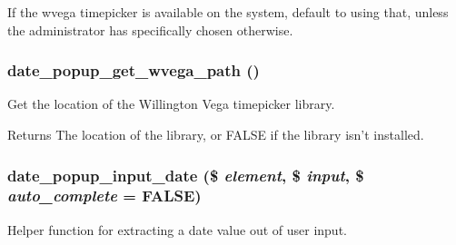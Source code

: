 If the wvega timepicker is available on the system, default to using that, unless the administrator has specifically chosen otherwise. \hypertarget{date__popup_8module_abef7f63b1aaef535f22f89f2756c2e9c}{
\subsubsection[{date\_\-popup\_\-get\_\-wvega\_\-path}]{\setlength{\rightskip}{0pt plus 5cm}date\_\-popup\_\-get\_\-wvega\_\-path ()}}
\label{date__popup_8module_abef7f63b1aaef535f22f89f2756c2e9c}
Get the location of the Willington Vega timepicker library.

\begin{DoxyReturn}{Returns}
The location of the library, or FALSE if the library isn't installed. 
\end{DoxyReturn}
\hypertarget{date__popup_8module_ab02977100e1912ca4c4a5c8b6de75da6}{
\subsubsection[{date\_\-popup\_\-input\_\-date}]{\setlength{\rightskip}{0pt plus 5cm}date\_\-popup\_\-input\_\-date (\$ {\em element}, \/  \$ {\em input}, \/  \$ {\em auto\_\-complete} = {\ttfamily FALSE})}}
\label{date__popup_8module_ab02977100e1912ca4c4a5c8b6de75da6}
Helper function for extracting a date value out of user input.


